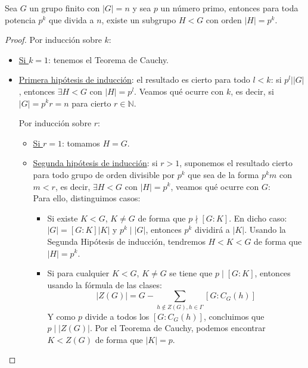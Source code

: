\begin{teo}\label{teo:subgrupo_potencia_p}
    Sea $G$ un grupo finito con $|G| = n$ y sea $p$ un número primo, entonces para toda potencia $p^k$ que divida a $n$, existe un subgrupo $H<G$ con orden $|H| = p^k$.
    \begin{proof}
        Por inducción sobre $k$:
        \begin{itemize}
            \item \underline{Si $k = 1$}: tenemos el Teorema de Cauchy.
            \item \underline{Primera hipótesis de inducción}: el resultado es cierto para todo $l<k$: si $p^l | |G|$, entonces $\exists H<G$ con $|H| = p^l$. \newline Veamos qué ocurre con $k$, es decir, si ${|G| = p^kr = n}$ para cierto $r\in \mathbb{N}$.

                Por inducción sobre $r$:
                \begin{itemize}
                    \item \underline{Si $r=1$}: tomamos $H = G$.
                    \item \underline{Segunda hipótesis de inducción}: si $r>1$, suponemos el resultado cierto para todo grupo de orden divisible por $p^k$ que sea de la forma $p^k m$ con $m<r$, es decir, $\exists H<G$ con $|H| = p^k$, veamos qué ocurre con $G$:\\

                        Para ello, distinguimos casos:
                        \begin{itemize}
                            \item Si existe $K<G$, $K \neq G$ de forma que $p\nmid [G:K]$. En dicho caso: $|G| = [G:K]|K|$ y $p^k \mid |G|$, entonces $p^k$ dividirá a $|K|$. Usando la Segunda Hipótesis de inducción, tendremos $H<K<G$ de forma que $|H| = p^k$.
                            \item Si para cualquier $K<G$, $K\neq G$ se tiene que $p\mid [G:K]$, entonces usando la fórmula de las clases:
                                \begin{equation*}
                                    |Z(G)| = G - \sum_{h\notin Z(G), h\in \Gamma} [G:C_G(h)]
                                \end{equation*}
                                Y como $p$ divide a todos los $[G:C_G(h)]$, concluimos que $p \mid |Z(G)|$. Por el Teorema de Cauchy, podemos encontrar $K<Z(G)$ de forma que $|K| = p$.


\end{itemize}
\end{itemize}
\end{itemize}
\end{proof}
\end{teo}
